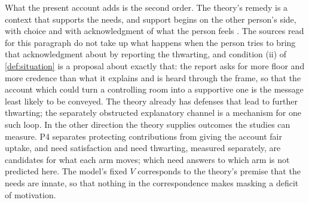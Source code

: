 What the present account adds is the second order. The theory's remedy is a context that supports the needs, and support begins on the other person's side, with choice and with acknowledgment of what the person feels \cite{RyanDeci2022}. The sources read for this paragraph do not take up what happens when the person tries to bring that acknowledgment about by reporting the thwarting, and condition (ii) of \autoref{def:situation} is a proposal about exactly that: the report asks for more floor and more credence than what it explains and is heard through the frame, so that the account which could turn a controlling room into a supportive one is the message least likely to be conveyed. The theory already has defenses that lead to further thwarting; the separately obstructed explanatory channel is a mechanism for one such loop. In the other direction the theory supplies outcomes the studies can measure. P4 separates protecting contributions from giving the account fair uptake, and need satisfaction and need thwarting, measured separately, are candidates for what each arm moves; which need answers to which arm is not predicted here. The model's fixed $V$ corresponds to the theory's premise that the needs are innate, so that nothing in the correspondence makes masking a deficit of motivation.

